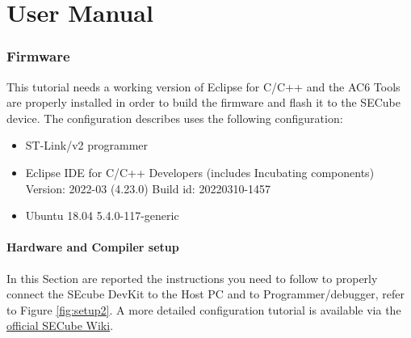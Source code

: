 \chapter{User Manual}
\label{usermanual}


\subsection{Firmware}
This tutorial needs a working version of Eclipse for C/C++ and the AC6 Tools are properly installed in order to build the firmware and flash it to the SECube device. The configuration describes uses the following configuration:
\begin{itemize}
	\item ST-Link/v2 programmer
	\item Eclipse IDE for C/C++ Developers (includes Incubating components) Version: 2022-03 (4.23.0) Build id: 20220310-1457
	\item Ubuntu 18.04 5.4.0-117-generic
\end{itemize}

\subsubsection{Hardware and Compiler setup}
In this Section are reported the instructions you need to follow to properly connect the SEcube DevKit to the Host PC and to Programmer/debugger, refer to Figure \ref{fig:setup2}. A more detailed configuration tutorial is available via the  \href{https://github.com/SEcube-Project/SEcube-SDK/blob/master/wiki/wiki_rel_012.pdf}{official SECube Wiki}.

